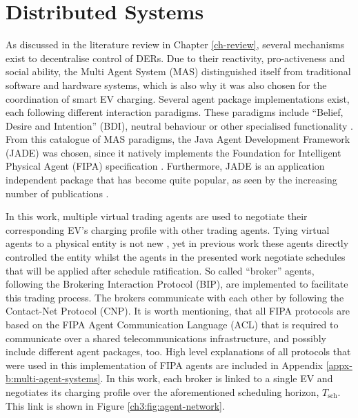 \section{Distributed Systems}
\label{ch3:sec:distributed-systems}

As discussed in the literature review in Chapter \ref{ch-review}, several mechanisms exist to decentralise control of DERs.
Due to their reactivity, pro-activeness and social ability, the Multi Agent System (MAS) distinguished itself from traditional software and hardware systems, which is also why it was also chosen for the coordination of smart EV charging.
Several agent package implementations exist, each following different interaction paradigms.
These paradigms include ``Belief, Desire and Intention'' (BDI), neutral behaviour or other specialised functionality \cite{Luck2004}.
From this catalogue of MAS paradigms, the Java Agent Development Framework (JADE) was chosen, since it natively implements the Foundation for Intelligent Physical Agent (FIPA) specification \cite{JADE-website, FIPA-agent-specs}.
Furthermore, JADE is an application independent package that has become quite popular, as seen by the increasing number of publications \cite{Karfopoulos2013, Eddy2011, Kuo2013, Mocci2014, Li2017}.

In this work, multiple virtual trading agents are used to negotiate their corresponding EV's charging profile with other trading agents.
Tying virtual agents to a physical entity is not new \cite{Nagata2002, Dimeas2005, Nguyen2011, Nagata2012}, yet in previous work these agents directly controlled the entity whilst the agents in the presented work negotiate schedules that will be applied after schedule ratification.
So called ``broker'' agents, following the Brokering Interaction Protocol (BIP), are implemented to facilitate this trading process.
The brokers communicate with each other by following the Contact-Net Protocol (CNP).
It is worth mentioning, that all FIPA protocols are based on the FIPA Agent Communication Language (ACL) that is required to communicate over a shared telecommunications infrastructure, and possibly include different agent packages, too.
High level explanations of all protocols that were used in this implementation of FIPA agents are included in Appendix \ref{appx-b:multi-agent-systems}.
In this work, each broker is linked to a single EV and negotiates its charging profile over the aforementioned scheduling horizon, $T_\text{sch}$.
This link is shown in Figure \ref{ch3:fig:agent-network}.



